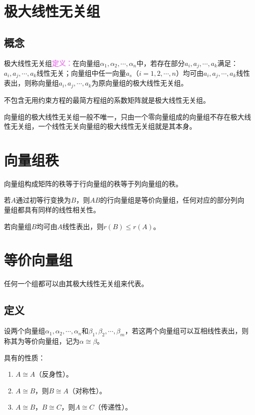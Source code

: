 \documentclass[UTF8, 12pt]{ctexart}
\begin{document}
\section{极大线性无关组}

\subsection{概念}

极大线性无关组\textcolor{violet}{\textbf{定义：}}在向量组$\alpha_1,\alpha_2,\cdots,\alpha_n$中，若存在部分$a_i,a_j,\cdots,a_k$满足：$a_i,a_j,\cdots,a_k$线性无关；向量组中任一向量$a_s$（$i=1,2,\cdots,n$）均可由$a_i,a_j,\cdots,a_k$线性表出，则称向量组$a_i,a_j,\cdots,a_k$为原向量组的极大线性无关组。

不包含无用约束方程的最简方程组的系数矩阵就是极大线性无关组。

向量组的极大线性无关组一般不唯一，只由一个零向量组成的向量组不存在极大线性无关组，一个线性无关向量组的极大线性无关组就是其本身。

\section{向量组秩}

向量组构成矩阵的秩等于行向量组的秩等于列向量组的秩。

若$A$通过初等行变换为$B$，则$AB$的行向量组是等价向量组，任何对应的部分列向量组都具有同样的线性相关性。

若向量组$B$均可由$A$线性表出，则$r(B)\leqslant r(A)$。

\section{等价向量组}

任何一个组都可以由其极大线性无关组来代表。

\subsection{定义}

设两个向量组$\alpha_1,\alpha_2,\cdots,\alpha_n$和$\beta_1,\beta_2,\cdots,\beta_m$，若这两个向量组可以互相线性表出，则称其为等价向量组，记为$\alpha\cong\beta$。

具有的性质：

\begin{enumerate}
    \item $A\cong A$（反身性）。
    \item $A\cong B$，则$B\cong A$（对称性）。
    \item $A\cong B$，$B\cong C$，则$A\cong C$（传递性）。
\end{enumerate}
\end{document}
